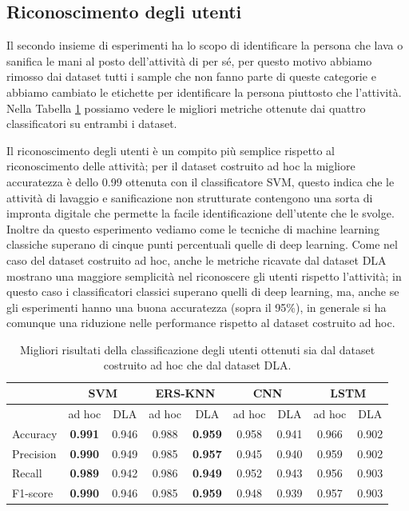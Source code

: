 \subsection{Riconoscimento degli utenti}
\label{ssec:riconoscimento-degli-utenti}

Il secondo insieme di esperimenti ha lo scopo di identificare la persona che lava o sanifica le mani al posto dell'attività di per sé, per questo motivo abbiamo rimosso dai dataset tutti i sample che non fanno parte di queste categorie e abbiamo cambiato le etichette per identificare la persona piuttosto che l'attività. Nella Tabella \ref{tab:person-classification} possiamo vedere le migliori metriche ottenute dai quattro classificatori su entrambi i dataset. 

Il riconoscimento degli utenti è un compito più semplice rispetto al riconoscimento delle attività; per il dataset costruito ad hoc la migliore accuratezza è dello 0.99 ottenuta con il classificatore SVM, questo indica che le attività di lavaggio e sanificazione non strutturate contengono una sorta di impronta digitale che permette la facile identificazione dell'utente che le svolge. Inoltre da questo esperimento vediamo come le tecniche di machine learning classiche superano di cinque punti percentuali quelle di deep learning. Come nel caso del dataset costruito ad hoc, anche le metriche ricavate dal dataset DLA mostrano una maggiore semplicità nel riconoscere gli utenti rispetto l'attività; in questo caso i classificatori classici superano quelli di deep learning, ma, anche se gli esperimenti hanno una buona accuratezza (sopra il 95\%), in generale si ha comunque una riduzione nelle performance rispetto al dataset costruito ad hoc.

\begin{table}
    \centering
    \begin{tabular}{l | c c | c c | c c | c c}
        \hline
        & \multicolumn{2}{c}{SVM} & \multicolumn{2}{c}{ERS-KNN} & \multicolumn{2}{c}{CNN} & \multicolumn{2}{c}{LSTM} \\
        \hline
        & ad hoc & DLA & ad hoc & DLA & ad hoc & DLA & ad hoc & DLA \\
        \hline
        Accuracy  & \textbf{0.991} & 0.946 & 0.988 & \textbf{0.959} & 0.958 & 0.941 & 0.966 & 0.902 \\
        Precision & \textbf{0.990} & 0.949 & 0.985 & \textbf{0.957} & 0.945 & 0.940 & 0.959 & 0.902 \\
        Recall    & \textbf{0.989} & 0.942 & 0.986 & \textbf{0.949} & 0.952 & 0.943 & 0.956 & 0.903 \\
        F1-score  & \textbf{0.990} & 0.946 & 0.985 & \textbf{0.959} & 0.948 & 0.939 & 0.957 & 0.903 \\
        \hline
    \end{tabular}
    \caption{Migliori risultati della classificazione degli utenti ottenuti sia dal dataset costruito ad hoc che dal dataset DLA.}
    \label{tab:person-classification}
\end{table}

